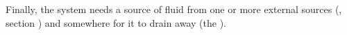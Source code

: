 




Finally, the system needs a source of fluid from one or
more external sources (, section ) and somewhere for it to drain away (the
).


